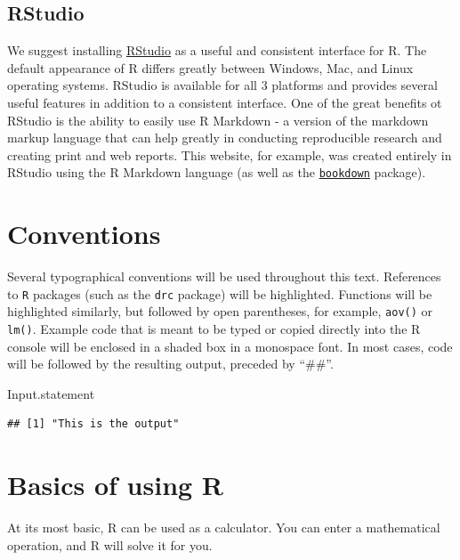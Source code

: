 \documentclass[letterpaper,]{book}
\newenvironment{Shaded}{\begin{snugshade}}{\end{snugshade}}
\newcommand{\NormalTok}[1]{#1}
\begin{document}
\hypertarget{rstudio}{%
\subsection{RStudio}\label{rstudio}}

We suggest installing \href{http://www.rstudio.com/}{RStudio} as a useful and consistent interface for R. The default appearance of R differs greatly between Windows, Mac, and Linux operating systems. RStudio is available for all 3 platforms and provides several useful features in addition to a consistent interface. One of the great benefits ot RStudio is the ability to easily use R Markdown - a version of the markdown markup language that can help greatly in conducting reproducible research and creating print and web reports. This website, for example, was created entirely in RStudio using the R Markdown language (as well as the \href{https://bookdown.org/}{\texttt{bookdown}} package).

\hypertarget{conventions}{%
\section{Conventions}\label{conventions}}

Several typographical conventions will be used throughout this text. References to \texttt{R} packages (such as the \texttt{drc} package) will be highlighted. Functions will be highlighted similarly, but followed by open parentheses, for example, \texttt{aov()} or \texttt{lm()}. Example code that is meant to be typed or copied directly into the R console will be enclosed in a shaded box in a monospace font. In most cases, code will be followed by the resulting output, preceded by ``\#\#''.

\begin{Shaded}
\begin{Highlighting}[]
\NormalTok{Input.statement}
\end{Highlighting}
\end{Shaded}

\begin{verbatim}
## [1] "This is the output"
\end{verbatim}

\hypertarget{basics}{%
\section{Basics of using R}\label{basics}}

At its most basic, R can be used as a calculator. You can enter a mathematical operation, and R will solve it for you.
\end{document}
